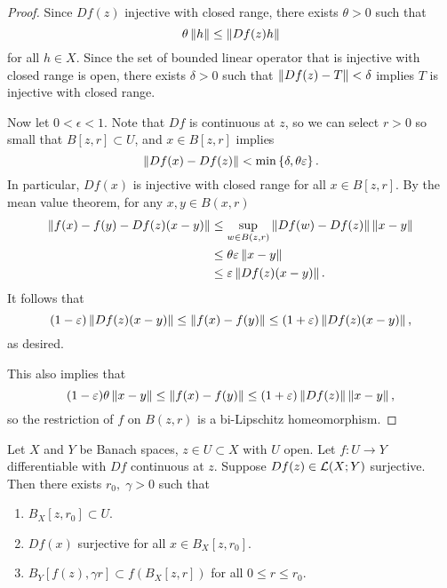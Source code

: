 \documentclass[a4paper]{article}
\begin{document}
\begin{proof}

Since $Df(z)$ injective with closed range, there exists
$\theta > 0$ such that
\[
\theta \left\lVert h\right\rVert \leq \left\lVert Df(z) h\right\rVert
\]
for all $h \in X$. Since the set of bounded linear operator
that is injective with closed range is open, there exists
$\delta > 0$ such that $\left\lVert Df(z) - T\right\rVert < \delta$ implies
$T$ is injective with closed range.

Now let $0 < \epsilon < 1$. Note that $Df$
is continuous at $z$, so we can select $r > 0$ so small
that $B[z, r] \subset U$, and $x \in B[z, r]$ implies
\[
\left\lVert Df(x) - Df(z)\right\rVert < \min \left\{ \delta, \theta \varepsilon \right\}.
\]
In particular, $Df(x)$ is injective with closed range
for all $x \in B[z, r]$. By the mean value theorem,
for any $x, y \in B(x, r)$
\[
\begin{aligned}
\left\lVert f(x) - f(y) - Df(z) (x - y)\right\rVert
&\leq \sup_{w \in B(z, r)} \left\lVert Df(w) - Df(z)\right\rVert \left\lVert x - y\right\rVert \\
&\leq \theta \varepsilon \left\lVert x - y\right\rVert \\
&\leq \varepsilon \left\lVert Df(z) (x - y)\right\rVert.
\end{aligned}
\]
It follows that
\[
(1 - \varepsilon) \left\lVert Df(z)(x - y)\right\rVert
\leq \left\lVert f(x) - f(y)\right\rVert
\leq (1 + \varepsilon) \left\lVert Df(z) (x - y)\right\rVert,
\]
as desired.

This also implies that
\[
(1 - \varepsilon) \theta \left\lVert x - y\right\rVert
\leq \left\lVert f(x) - f(y)\right\rVert \leq (1 + \varepsilon)
\left\lVert Df(z)\right\rVert \left\lVert x - y\right\rVert,
\]
so the restriction of $f$ on $B(z, r)$ is a bi-Lipschitz
homeomorphism.

\end{proof}

\begin{thm}
Let $X$ and $Y$ be Banach spaces, $z \in U \subset X$ with
$U$ open. Let $f: U \to Y$ differentiable with
$Df$ continuous at $z$. Suppose $Df(z) \in \mathcal{L}(X; Y)$
surjective. Then there exists $r_0, \; \gamma > 0$ such that
\begin{enumerate}
  \item $B_X[z, r_0] \subset U$.
  \item $Df(x)$ surjective for all $x \in B_X[z, r_0]$.
  \item $B_Y[f(z), \gamma r] \subset f(B_X[z, r])$ for all
  $0 \leq r \leq r_0$.
\end{enumerate}
\end{thm}
\end{document}
